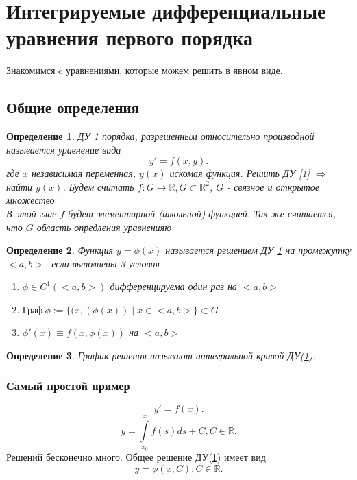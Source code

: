\documentclass[14pt]{extarticle}
\newtheorem{definition}{Определение}
\begin{document}
\section{Интегрируемые дифференциальные уравнения первого порядка}
Знакомимся c уравнениями, которые можем решить в явном виде.
\subsection{Общие определения}
\begin{definition} \label{diff1}
	ДУ 1 порядка, разрешенным относительно производной называется уравнение вида
	\[
		y' =  f(x,y)
		.\] \label{1}
	где $x$ независимая переменная,  $y(x)$ искомая функция. Решить ДУ \ref{1} $\iff$
	найти $y(x)$. Будем считать $f : G \to \mathbb{R}, G \subset \mathbb{R}^2$, $G$ - связное и открытое множество\\
	В этой глае  $f$ будет элементарной (школьной) функцией. Так же считается, что $G$ область опредления уравненияю
\end{definition}
\begin{definition}
	Функция $y = \phi(x)$ называется решением ДУ  \ref{diff1} на промежутку $<a,b>$,
	если выполнены 3 условия
	\begin{enumerate}
		\item $\phi \in C^{1}(<a,b>)$ дифференцируема один раз на $<a,b>$
		\item $\text{Граф}~\phi := \{(x,(\phi(x)) \mid x \in <a,b>\} \subset G$
		\item $\phi'(x) \equiv f(x,\phi(x))$ на  $<a,b>$
	\end{enumerate}
\end{definition}
\begin{definition}
	График решения называют интегральной кривой ДУ(\ref{diff1}).
\end{definition}
\subsubsection{Самый простой пример}
\[
	y' = f(x)
	.\]
\[
	y =  \int\limits_{x_0}^{x} f(s) ds + C, C \in \mathbb{R}
	.\]
Решений бесконечно много. Общее решение ДУ(\ref{diff1}) имеет вид
\[
	y = \phi(x,C), C \in \mathbb{R}
	.\]
\end{document}
